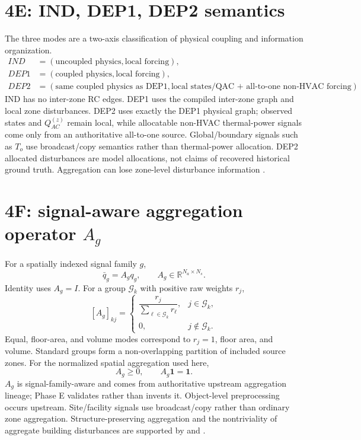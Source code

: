 \documentclass[11pt]{article}
\newcommand{\R}{\mathbb{R}}
\newcommand{\ones}{\mathbf{1}}
\begin{document}
\section{4E: IND, DEP1, DEP2 semantics}
The three modes are a two-axis classification of physical coupling and information organization.
\begin{align*}
IND  &= (\text{uncoupled physics},\text{local forcing}),\\
DEP1 &= (\text{coupled physics},\text{local forcing}),\\
DEP2 &= (\text{same coupled physics as DEP1},\text{local states/QAC + all-to-one non-HVAC forcing}).
\end{align*}
IND has no inter-zone RC edges. DEP1 uses the compiled inter-zone graph and local zone disturbances. DEP2 uses exactly the DEP1 physical graph; observed states and $Q_{AC}^{(z)}$ remain local, while allocatable non-HVAC thermal-power signals come only from an authoritative all-to-one source. Global/boundary signals such as $T_o$ use broadcast/copy semantics rather than thermal-power allocation. DEP2 allocated disturbances are model allocations, not claims of recovered historical ground truth. Aggregation can lose zone-level disturbance information \citep{GuoCoffmanMunkEtAl2021Aggregation}.

\section{4F: signal-aware aggregation operator $A_g$}
For a spatially indexed signal family $g$,
\[
\bar q_g=A_gq_g,\qquad A_g\in\R^{N_a\times N_s}.
\]
Identity uses $A_g=I$. For a group $\mathcal G_k$ with positive raw weights $r_j$,
\[
[A_g]_{kj}=\begin{cases}
\dfrac{r_j}{\sum_{\ell\in\mathcal G_k}r_\ell},&j\in\mathcal G_k,\\
0,&j\notin\mathcal G_k.
\end{cases}
\]
Equal, floor-area, and volume modes correspond to $r_j=1$, floor area, and volume. Standard groups form a non-overlapping partition of included source zones. For the normalized spatial aggregation used here,
\[
A_g\ge0,\qquad A_g\ones=\ones.
\]
$A_g$ is signal-family-aware and comes from authoritative upstream aggregation lineage; Phase E validates rather than invents it. Object-level preprocessing occurs upstream. Site/facility signals use broadcast/copy rather than ordinary zone aggregation. Structure-preserving aggregation and the nontriviality of aggregate building disturbances are supported by \citet{DengGoyalBarooahMehta2014StructurePreserving} and \citet{GuoCoffmanMunkEtAl2021Aggregation}.
\end{document}
